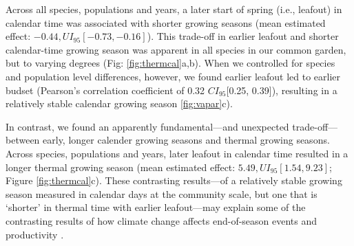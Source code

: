 \documentclass{article}[12pt]
\begin{document}

Across all species, populations and years, a later start of spring (i.e., leafout) in calendar time was associated with shorter growing seasons (mean estimated effect: $-0.44, UI_{95}[-0.73, -0.16]$). This trade-off in earlier leafout and shorter calendar-time growing season was apparent in all species in our common garden, but to varying degrees (Fig: \ref{fig:thermcal}a,b). When we controlled for species and population level differences, however, we found earlier leafout led to earlier budset (Pearson's correlation coefficient of 0.32 $CI_{95}$[0.25, 0.39]), resulting in a relatively stable calendar growing season \ref{fig:vapar}c). %

In contrast, we found an apparently fundamental---and unexpected trade-off---between early, longer calender growing seasons and thermal growing seasons. Across species, populations and years, later leafout in calendar time resulted in a longer thermal growing season (mean estimated effect: $5.49, UI_{95}[1.54, 9.23]$; Figure \ref{fig:thermcal}c). These contrasting results---of a relatively stable growing season measured in calendar days at the community scale, but one that is `shorter' in thermal time with earlier leafout---may explain some of the contrasting results of how climate change affects end-of-season events and productivity \citep{Zani2020}. %
\end{document}
